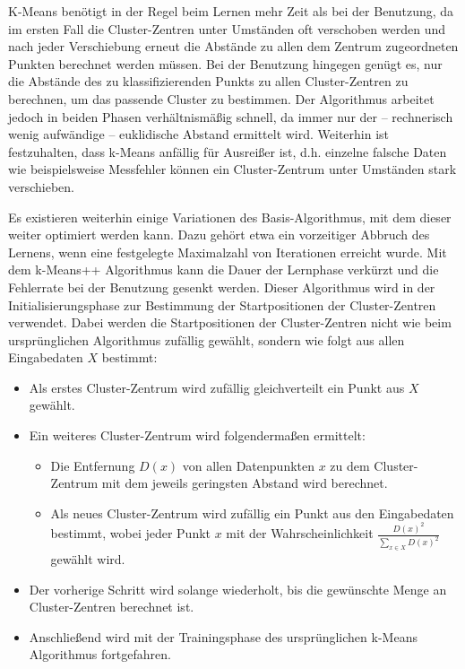 K-Means benötigt in der Regel beim Lernen mehr Zeit als bei der Benutzung, da im ersten Fall die Cluster-Zentren unter Umständen oft verschoben werden und nach jeder Verschiebung erneut die Abstände zu allen dem Zentrum zugeordneten Punkten berechnet werden müssen. Bei der Benutzung hingegen genügt es, nur die Abstände des zu klassifizierenden Punkts zu allen Cluster-Zentren zu berechnen, um das passende Cluster zu bestimmen. Der Algorithmus arbeitet jedoch
in beiden Phasen verhältnismäßig schnell, da immer nur 
der -- rechnerisch wenig aufwändige -- euklidische Abstand ermittelt wird.
Weiterhin ist festzuhalten, dass k-Means anfällig für Ausreißer ist, d.h. einzelne falsche Daten wie beispielsweise Messfehler können ein Cluster-Zentrum unter Umständen stark verschieben.

Es existieren weiterhin einige Variationen des Basis-Algorithmus, mit dem dieser weiter optimiert werden kann. Dazu gehört etwa ein vorzeitiger Abbruch des Lernens, wenn eine festgelegte Maximalzahl von Iterationen erreicht wurde. Mit dem k-Means++ Algorithmus \cite{kMeans++} kann die Dauer der Lernphase verkürzt und die Fehlerrate bei der Benutzung gesenkt werden. Dieser Algorithmus wird in der Initialisierungsphase zur Bestimmung der Startpositionen der Cluster-Zentren verwendet. Dabei werden die Startpositionen der Cluster-Zentren nicht wie beim ursprünglichen Algorithmus zufällig gewählt, sondern wie folgt aus allen Eingabedaten $X$ bestimmt:
\begin{itemize}
\item Als erstes Cluster-Zentrum wird zufällig gleichverteilt ein Punkt aus $X$ gewählt.
\item Ein weiteres Cluster-Zentrum wird folgendermaßen ermittelt: 
\begin{itemize}
\item Die Entfernung $D(x)$ von allen Datenpunkten $x$ zu dem Cluster-Zentrum mit dem jeweils geringsten Abstand wird berechnet. 
\item Als neues Cluster-Zentrum wird zufällig ein Punkt aus den Eingabedaten bestimmt, wobei jeder Punkt $x$ mit der Wahrscheinlichkeit $\frac{ D(x)^{2} }{\sum\nolimits_{x \in X}D(x)^{2}}$ gewählt wird.
\end{itemize}
\item Der vorherige Schritt wird solange wiederholt, bis die gewünschte Menge an Cluster-Zentren berechnet ist.
\item Anschließend wird mit der Trainingsphase des ursprünglichen k-Means Algorithmus fortgefahren.
\end{itemize}



